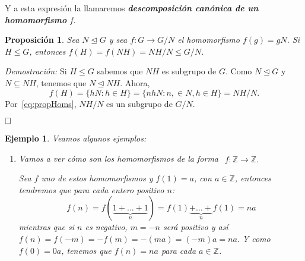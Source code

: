 \documentclass[12pt]{article}
\newtheorem{proposition}[theorem]{Proposición}
\newtheorem{example}{Ejemplo}[theorem]
\begin{document}
Y a esta expresión la llamaremos \textbf{\textit{descomposición canónica de un homomorfismo}} $f$.

\begin{proposition}\label{eq:lemIsom} Sea $N \unlhd G$ y sea $f \colon G \longrightarrow G/N$ el homomorfismo $f(g) = gN$. Si $H \leq G$, entonces $f(H) = f(NH)=NH/N \leq G/N$.
\end{proposition}
\emph{Demostración: }Si $H \leq G$ sabemos que $NH$ es subgrupo de $G$. Como $N \unlhd G$ y $N \subseteq NH$, tenemos que $N \unlhd NH$. Ahora, $$f(H) = \lbrace hN : h \in H \rbrace = \lbrace nhN :n, \in N, h \in H \rbrace = NH/N.$$ Por~\ref{eq:propHoms}, $NH/N$ es un subgrupo de $G/N$.

$\hfill \square$

\begin{example}Veamos algunos ejemplos:
\begin{enumerate}
\item Vamos a ver cómo son los homomorfismos de la forma $
\begin{array}{rccl}
f\colon \mathbb{Z} \longrightarrow  \mathbb{Z}.
\end{array}
$

Sea $f$ uno de estos homomorfismos y $f(1) = a$, con $a\in \mathbb{Z}$, entonces tendremos que para cada entero positivo $n$: $$f(n) = f(\underbrace{1+\ldots+1}_n) = f(1)\underbrace{ + \ldots + }_n f(1) = na$$
mientras que si $n$ es negativo, $m = -n$ será positivo y así $f(n) = f(-m) = -f(m) = -(ma) = (-m)a = na.$ Y como $f(0) = 0a$, tenemos que $f(n) = na$ para cada $a\in \mathbb{Z}$.


\end{enumerate}
\end{example}
\end{document}
